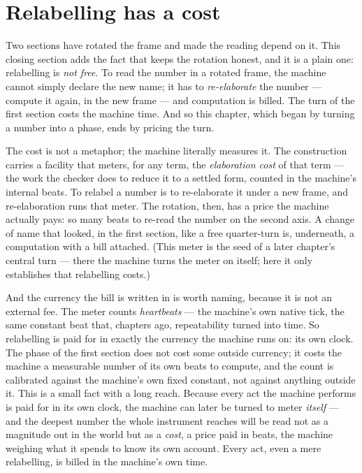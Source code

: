 \section{Relabelling has a cost}

Two sections have rotated the frame and made the reading depend on it. This closing section adds the fact that keeps
the rotation honest, and it is a plain one: relabelling is \emph{not free}. To read the number in a rotated frame, the
machine cannot simply declare the new name; it has to \emph{re-elaborate} the number --- compute it again, in the new
frame --- and computation is billed. The turn of the first section costs the machine time. And so this chapter, which
began by turning a number into a phase, ends by pricing the turn.

The cost is not a metaphor; the machine literally measures it. The construction carries a facility that meters, for any
term, the \emph{elaboration cost} of that term --- the work the checker does to reduce it to a settled form, counted in
the machine's internal beats. To relabel a number is to re-elaborate it under a new frame, and re-elaboration runs that
meter. The rotation, then, has a price the machine actually pays: so many beats to re-read the number on the second
axis. A change of name that looked, in the first section, like a free quarter-turn is, underneath, a computation with a
bill attached. (This meter is the seed of a later chapter's central turn --- there the machine turns the meter on
itself; here it only establishes that relabelling costs.)

And the currency the bill is written in is worth naming, because it is not an external fee. The meter counts
\emph{heartbeats} --- the machine's own native tick, the same constant beat that, chapters ago, repeatability turned
into time. So relabelling is paid for in exactly the currency the machine runs on: its own clock. The phase of the
first section does not cost some outside currency; it costs the machine a measurable number of its own beats to
compute, and the count is calibrated against the machine's own fixed constant, not against anything outside it. This is
a small fact with a long reach. Because every act the machine performs is paid for in its own clock, the machine can
later be turned to meter \emph{itself} --- and the deepest number the whole instrument reaches will be read not as a
magnitude out in the world but as a \emph{cost}, a price paid in beats, the machine weighing what it spends to know its
own account. Every act, even a mere relabelling, is billed in the machine's own time.

